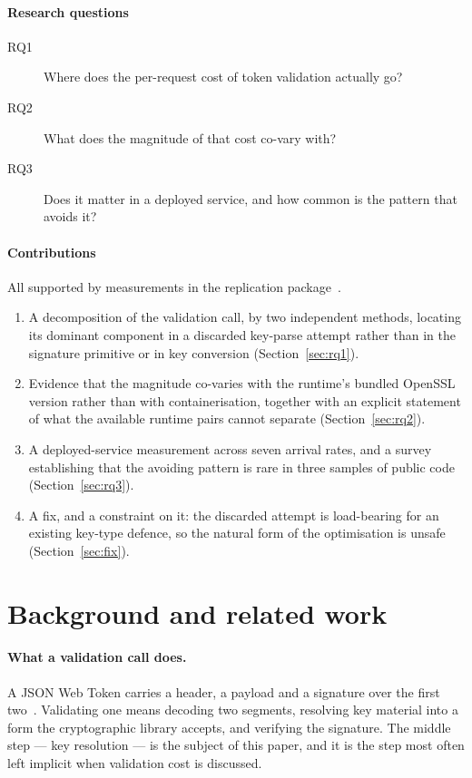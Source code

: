 \documentclass[pdflatex,sn-basic,twocolumn]{sn-jnl}%
\begin{document}
\paragraph{Research questions}
\begin{description}
\item[RQ1] Where does the per-request cost of token validation actually go?
\item[RQ2] What does the magnitude of that cost co-vary with?
\item[RQ3] Does it matter in a deployed service, and how common is the pattern
           that avoids it?
\end{description}

\paragraph{Contributions} All supported by measurements in the replication
package~\cite{artifact2026}.

\begin{enumerate}
\item A decomposition of the validation call, by two independent methods,
      locating its dominant component in a discarded key-parse attempt rather
      than in the signature primitive or in key conversion
      (Section~\ref{sec:rq1}).
\item Evidence that the magnitude co-varies with the runtime's bundled OpenSSL
      version rather than with containerisation, together with an explicit
      statement of what the available runtime pairs cannot separate
      (Section~\ref{sec:rq2}).
\item A deployed-service measurement across seven arrival rates, and a survey
      establishing that the avoiding pattern is rare in three samples of public
      code (Section~\ref{sec:rq3}).
\item A fix, and a constraint on it: the discarded attempt is load-bearing for
      an existing key-type defence, so the natural form of the optimisation is
      unsafe (Section~\ref{sec:fix}).
\end{enumerate}

\section{Background and related work}\label{sec:related}

\paragraph{What a validation call does.} A JSON Web Token carries a header, a
payload and a signature over the first two~\cite{rfc7519}. Validating one means
decoding two segments, resolving key material into a form the cryptographic
library accepts, and verifying the signature. The middle step --- key
resolution --- is the subject of this paper, and it is the step most often left
implicit when validation cost is discussed.
\end{document}
